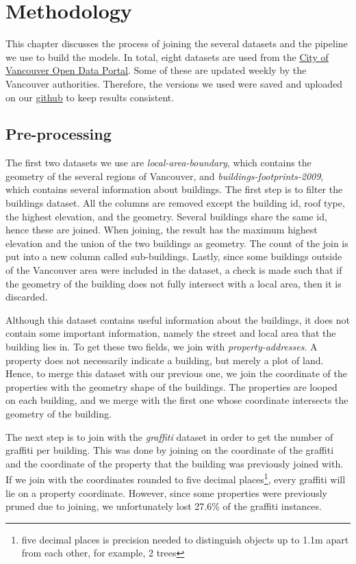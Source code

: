 \chapter{Methodology}


This chapter discusses the process of joining the several datasets and the pipeline we use to build the models. In total, eight datasets are used from the \href{https://opendata.vancouver.ca/pages/home/}{City of Vancouver Open Data Portal}. Some of these are updated weekly by the Vancouver authorities. Therefore, the versions we used were saved and uploaded on our \href{https://github.com/CowKeyMan/PredictingGraffitiUsingCityLayouts}{github} to keep results consistent.

\section{Pre-processing}

The first two datasets we use are \textit{local-area-boundary}, which contains the geometry of the several regions of Vancouver, and \textit{buildings-footprints-2009}, which contains several information about buildings. The first step is to filter the buildings dataset. All the columns are removed except the building id, roof type, the highest elevation, and the geometry. Several buildings share the same id, hence these are joined. When joining, the result has the maximum highest elevation and the union of the two buildings as geometry. The count of the join is put into a new column called sub-buildings. Lastly, since some buildings outside of the Vancouver area were included in the dataset, a check is made such that if the geometry of the building does not fully intersect with a local area, then it is discarded.

Although this dataset contains useful information about the buildings, it does not contain some important information, namely the street and local area that the building lies in. To get these two fields, we join with \textit{property-addresses}. A property does not necessarily indicate a building, but merely a plot of land. Hence, to merge this dataset with our previous one, we join the coordinate of the properties with the geometry shape of the buildings. The properties are looped on each building, and we merge with the first one whose coordinate intersects the geometry of the building.

The next step is to join with the \textit{graffiti} dataset in order to get the number of graffiti per building. This was done by joining on the coordinate of the graffiti and the coordinate of the property that the building was previously joined with. If we join with the coordinates rounded to five decimal places\footnote{five decimal places is precision needed to distinguish objects up to 1.1m apart from each other, for example, 2 trees}, every graffiti will lie on a property coordinate. However, since some properties were previously pruned due to joining, we unfortunately lost 27.6\% of the graffiti instances.

